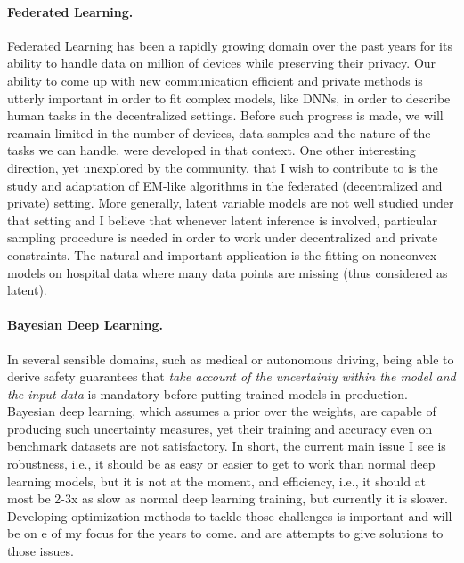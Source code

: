 \documentclass[twoside,11pt]{article}
\begin{document}
\paragraph{Federated Learning.} 
Federated Learning has been a rapidly growing domain over the past years for its ability to handle data on million of devices while preserving their privacy.
Our ability to come up with new communication efficient and private methods is utterly important in order to fit complex models, like DNNs, in order to describe human tasks in the decentralized settings.
Before such progress is made, we will reamain limited in the number of devices, data samples and the nature of the tasks we can handle.
\citep{had2020, karimi2020lars} were developed in that context.
One other interesting direction, yet unexplored by the community, that I wish to contribute to is the study and adaptation of EM-like algorithms in the federated (decentralized and private) setting.
More generally, latent variable models are not well studied under that setting and I believe that whenever latent inference is involved, particular sampling procedure is needed in order to work under decentralized and private constraints.
The natural and important application is the fitting on nonconvex models on hospital data where many data points are missing (thus considered as latent).


\vspace{0.08in}
\paragraph{Bayesian Deep Learning.} 
In several sensible domains, such as medical or autonomous driving, being able to derive safety guarantees that \emph{take account of the uncertainty within the model and the input data} is mandatory before putting trained models in production.
Bayesian deep learning, which assumes a prior over the weights, are capable of producing such uncertainty measures, yet their training and accuracy even on benchmark datasets are not satisfactory.
In short, the current main issue I see is robustness, i.e., it should be as easy or easier to get to work than normal deep learning models, but it is not at the moment, and efficiency, i.e., it should at most be 2-3x as slow as normal deep learning training, but currently it is slower.
Developing optimization methods to tackle those challenges is important and will be on e of my focus for the years to come.
\citep{karimi2020hwa} and \citep{karimi2020misso} are attempts to give solutions to those issues.
\end{document}
